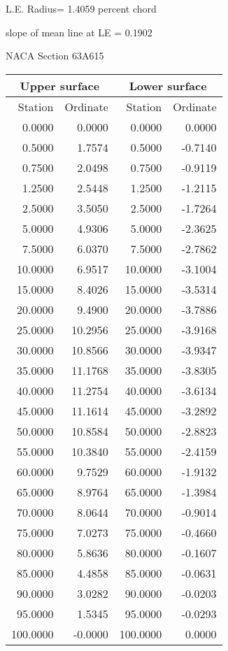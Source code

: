 \documentclass[11pt]{book}
\begin{document}
L.E. Radius=  1.4059 percent chord


 slope of mean line at LE =  0.1902
 \newpage
  \label{s63A615}
 \begin{Large}
 NACA Section 63A615
 \end{Large}
  
 \vspace{8mm}
 \begin{tabular}{|r|r|r|r|} \hline 
 \multicolumn{2}{|c|}{Upper surface} & \multicolumn{2}{|c|}{Lower surface} \\
 \hline
 Station & Ordinate & Station & Ordinate \\
 \hline
0.0000 & 0.0000 & 0.0000 & 0.0000 \\
0.5000 & 1.7574 & 0.5000 & -0.7140 \\
0.7500 & 2.0498 & 0.7500 & -0.9119 \\
1.2500 & 2.5448 & 1.2500 & -1.2115 \\
2.5000 & 3.5050 & 2.5000 & -1.7264 \\
5.0000 & 4.9306 & 5.0000 & -2.3625 \\
7.5000 & 6.0370 & 7.5000 & -2.7862 \\
10.0000 & 6.9517 & 10.0000 & -3.1004 \\
15.0000 & 8.4026 & 15.0000 & -3.5314 \\
20.0000 & 9.4900 & 20.0000 & -3.7886 \\
25.0000 & 10.2956 & 25.0000 & -3.9168 \\
30.0000 & 10.8566 & 30.0000 & -3.9347 \\
35.0000 & 11.1768 & 35.0000 & -3.8305 \\
40.0000 & 11.2754 & 40.0000 & -3.6134 \\
45.0000 & 11.1614 & 45.0000 & -3.2892 \\
50.0000 & 10.8584 & 50.0000 & -2.8823 \\
55.0000 & 10.3840 & 55.0000 & -2.4159 \\
60.0000 & 9.7529 & 60.0000 & -1.9132 \\
65.0000 & 8.9764 & 65.0000 & -1.3984 \\
70.0000 & 8.0644 & 70.0000 & -0.9014 \\
75.0000 & 7.0273 & 75.0000 & -0.4660 \\
80.0000 & 5.8636 & 80.0000 & -0.1607 \\
85.0000 & 4.4858 & 85.0000 & -0.0631 \\
90.0000 & 3.0282 & 90.0000 & -0.0203 \\
95.0000 & 1.5345 & 95.0000 & -0.0293 \\
100.0000 & -0.0000 & 100.0000 & 0.0000 \\
 \hline 
 \end{tabular}
\end{document}
